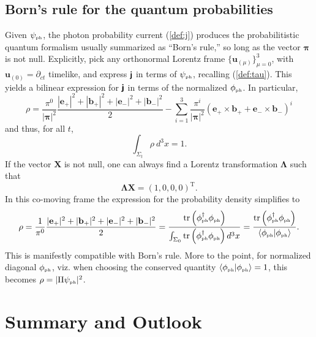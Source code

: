 \documentclass[12pt]{article}
\theoremstyle{definition}
\DeclareMathOperator{\tr}{tr}
\newcommand{\refeq}[1]{(\ref{#1})}
\newcommand{\tenseur}[1]{{\textbf{\textsf{#1}}}}
\newcommand{\bMj}{{\tenseur{j}}}
\newcommand{\bpi}{\boldsymbol{\pi}}
\numberwithin{equation}{section}
\newcommand{\bb}{\mathbf{b}}
\newcommand{\be}{\mathbf{e}}
\newcommand{\bu}{\mathbf{u}}
\newcommand{\bX}{\mathbf{X}}
\newcommand{\beq}{\begin{equation}}
\newcommand{\eeq}{\end{equation}}
\newcommand{\p}{\partial}
\newcommand{\bLa}{\boldsymbol{\Lambda}}
\newcommand{\psiPH}{{\psi_{\mbox{\rm\tiny ph}}}}
\newcommand{\phiPH}{{\phi_{\mbox{\rm\tiny ph}}}}
\newcommand{\Si}{\Sigma}
\begin{document}
\subsection{Born's rule for the quantum probabilities}\label{sec:Bornrule}\vspace{-5pt}

Given $\psiPH$, the photon probability current \refeq{def:j} 
produces the probabilitistic quantum formalism usually summarized as ``Born's rule,'' so long as the vector $\bpi$ is not null.
 Explicitly, pick any orthonormal Lorentz frame $\{\bu_{(\mu)}\}_{\mu = 0}^3$, with $\bu_{(0)}=\p_{ct}$ timelike, 
and express $\bMj$ in terms of $\psiPH$, recalling \refeq{def:tau}.
 This yields a bilinear expression for $\bMj$ in terms of the normalized $\phiPH$. 
  In particular,
\beq
\rho  =  \frac{\pi^0}{|\bpi|^2} \frac{|\be_+|^2 + |\bb_+|^2 + |\be_-|^2 + |\bb_-|^2}{2}  -
 \sum_{i=1}^3 \frac{\pi^i}{|\bpi|^2} \left( \be_+\times \bb_+ + \be_-\times\bb_- \right)^i
\eeq
and thus, for all $t$,
\beq
\int_{\Si_t} \rho\  d^3x = 1.
\eeq
 If the vector $\bX$ is not null, one can always find a Lorentz transformation $\bLa$ such that 
\beq
\bLa \bX = \left(1, 0, 0, 0\right)^{\mathrm{T}}.
\eeq 
 In this co-moving frame the expression for the probability density simplifies to
\beq
\rho = \frac{1}{\pi^0} \frac{|\be_+|^2 + |\bb_+|^2 + |\be_-|^2 + |\bb_-|^2}{2}
 =
 \frac{ \tr\left ({\phi^\dagger_{\mbox{\rm\tiny ph}}}\phiPH\right)}{\int_{\Si_0} \tr\left ({\phi^\dagger_{\mbox{\rm\tiny ph}}}\phiPH\right) d^3x} =
 \frac{\tr\left ({\phi^\dagger_{\mbox{\rm\tiny ph}}}\phiPH\right)}{\langle \phiPH | \phiPH \rangle}.
\eeq
 This is manifestly compatible with Born's rule.
 More to the point, for normalized diagonal $\phiPH$, viz. when choosing the conserved quantity $\langle\phiPH | \phiPH\rangle=1$, 
this becomes $\rho = |\Pi\psiPH|^2$.\vspace{-10pt}


\section{Summary and Outlook}\label{sec:conclusions}\vspace{-5pt}
\end{document}
